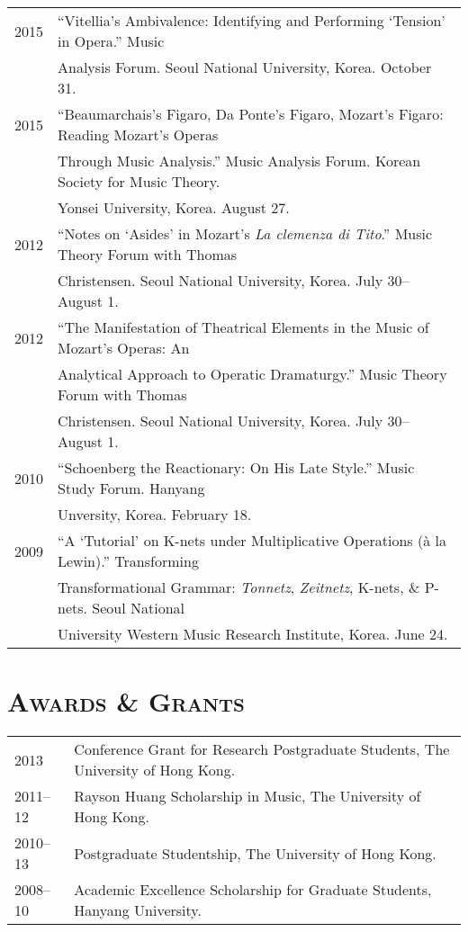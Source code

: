 \documentclass[a4paper,11pt]{article}
\begin{document}
  \hspace*{-0.25cm}
  \begin{tabular}{p{2.5cm} p{12.5cm}}
  2015 & ``Vitellia’s Ambivalence: Identifying and Performing ‘Tension’ in Opera.'' Music\\
  & Analysis Forum. Seoul National University, Korea. October 31.\\[2mm]
  
  2015 & ``Beaumarchais's Figaro, Da Ponte's Figaro, Mozart's Figaro: Reading Mozart's Operas\\
  & Through Music Analysis.'' Music Analysis Forum. Korean Society for Music Theory.\\
  & Yonsei University, Korea. August 27.\\[2mm]
  
  2012 & “Notes on ‘Asides’ in Mozart’s \textit{La clemenza di Tito}.” Music Theory Forum with Thomas\\
  & Christensen. Seoul National University, Korea. July 30–August 1.\\[2mm]

  2012 & “The Manifestation of Theatrical Elements in the Music of Mozart’s Operas: An\\
  & Analytical Approach to Operatic Dramaturgy.” Music Theory Forum with Thomas\\
  & Christensen. Seoul National University, Korea. July 30–August 1.\\[2mm]

  2010 & “Schoenberg the Reactionary: On His Late Style.” Music Study Forum. Hanyang\\
  & Unversity, Korea. February 18.\\[2mm]
  
  2009 & “A ‘Tutorial’ on K-nets under Multiplicative Operations (à la Lewin).” Transforming\\
  & Transformational Grammar: \textit{Tonnetz}, \textit{Zeitnetz}, K-nets, \& P-nets. Seoul National\\
  & University Western Music Research Institute, Korea. June 24.
  \end{tabular}
  
  \vspace{2.5mm}
  
  \section*{\textsc{Awards \& Grants}}
  
  \hspace*{-0.25cm}
  \begin{tabular}{p{2.5cm} l}
    2013 & Conference Grant for Research Postgraduate Students, The University of Hong Kong.\\
    2011–12 & Rayson Huang Scholarship in Music, The University of Hong Kong.\\
    2010–13 & Postgraduate Studentship, The University of Hong Kong.\\
    2008–10 & Academic Excellence Scholarship for Graduate Students, Hanyang University.
  \end{tabular}
  
\end{document}
